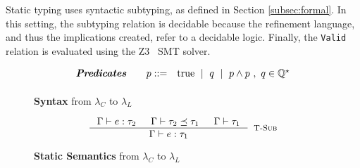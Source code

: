 Static typing uses syntactic subtyping, as defined in Section \ref{subsec:formal}. 
In this setting,  
the subtyping relation is decidable
because the refinement language, 
and thus the implications created, refer to a decidable logic.
Finally, the \texttt{Valid} relation is evaluated using 
the Z3~\cite{z3} SMT solver.
\begin{figure}[ht!]
\centering
$$
\begin{array}{rrcl}
\textbf{\emph{Predicates}} \quad
  & p ::=
  & 	\text{true}
  \ \mid \  q
  \ \mid \  p \land p \ , \ q \in \mathbb{Q}^\star
  \\[0.05in] 
\end{array}
$$
\caption{\textbf{Syntax} from $\lambda_C$ to $\lambda_L$}
\label{fig:liqsyntax}
\end{figure}
\begin{figure}[ht!]
\medskip {}
$$\begin{array}{cc}
\inference
  {  \hastype{\Gamma}{e}{\tau_2} && \isSubType{\Gamma}{\tau_2}{\tau_1} 
  && \isWellFormed{\Gamma}{\tau_1}
  }
  {\hastype{\Gamma}{e}{\tau_1}}
  [\tsub]
\end{array}$$
\caption{\textbf{Static Semantics} from $\lambda_C$ to $\lambda_L$}
\label{fig:rules}
\end{figure}